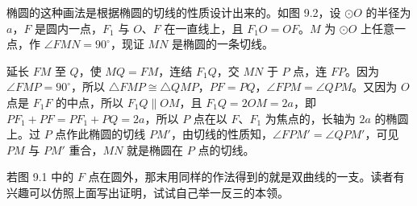 椭圆的这种画法是根据椭圆的切线的性质设计出来的。如图 9.2，设 $\odot O$ 的半径为 $a$，$F$ 是圆内一点，$F_1$ 与 $O$、$F$ 在一直线上，且 $F_1O = OF$。$M$ 为 $\odot O$ 上任意一点，作 $\angle FMN = 90^\circ$，现证 $MN$ 是椭圆的一条切线。

延长 $FM$ 至 $Q$，使 $MQ = FM$，连结 $F_1Q$，交 $MN$ 于 $P$ 点，连 $FP$。因为 $\angle FMP = 90^\circ$，所以 $\triangle FMP \cong \triangle QMP$，$PF = PQ$，$\angle FPM = \angle QPM$。又因为 $O$ 点是 $F_1F$ 的中点，所以 $F_1Q \parallel OM$，且 $F_1Q = 2OM = 2a$，即 $PF_1 + PF = PF_1 + PQ = 2a$，所以 $P$ 点在以 $F$、$F_1$ 为焦点的，长轴为 $2a$ 的椭圆上。过 $P$ 点作此椭圆的切线 $PM'$，由切线的性质知，$\angle FPM' = \angle QPM'$，可见 $PM$ 与 $PM'$ 重合，$MN$ 就是椭圆在 $P$ 点的切线。

若图 9.1 中的 $F$ 点在圆外，那末用同样的作法得到的就是双曲线的一支。读者有兴趣可以仿照上面写出证明，试试自己举一反三的本领。
